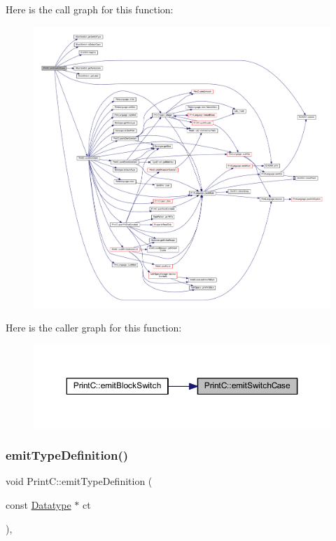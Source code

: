 Here is the call graph for this function\+:
\nopagebreak
\begin{figure}[H]
\begin{center}
\leavevmode
\includegraphics[width=350pt]{class_print_c_afe955f74fd15f96204c3060ea22ea080_cgraph}
\end{center}
\end{figure}
Here is the caller graph for this function\+:
\nopagebreak
\begin{figure}[H]
\begin{center}
\leavevmode
\includegraphics[width=350pt]{class_print_c_afe955f74fd15f96204c3060ea22ea080_icgraph}
\end{center}
\end{figure}
\mbox{\label{class_print_c_a36b4db5295cfb6eb9a9d93b36b2a5cc8}} 
\subsubsection{\texorpdfstring{emitTypeDefinition()}{emitTypeDefinition()}}
{\footnotesize\ttfamily void Print\+C\+::emit\+Type\+Definition (\begin{DoxyParamCaption}\item[{const \mbox{\hyperlink{class_datatype}{Datatype}} $\ast$}]{ct }\end{DoxyParamCaption})\hspace{0.3cm}{\ttfamily [protected]}, {\ttfamily [virtual]}}



